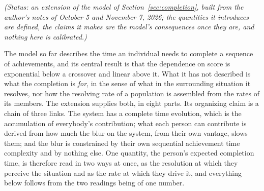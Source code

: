 \documentclass{article}
\begin{document}
\noindent\emph{(Status: an extension of the model of Section~\ref{sec:completion}, built from the author's notes of October 5 and November 7, 2026; the quantities it introduces are defined, the claims it makes are the model's consequences once they are, and nothing here is calibrated.)}

The model so far describes the time an individual needs to complete a sequence of achievements, and its central result is that the dependence on score is exponential below a crossover and linear above it. What it has not described is what the completion is \emph{for}, in the sense of what in the surrounding situation it resolves, nor how the resolving rate of a population is assembled from the rates of its members. The extension supplies both, in eight parts. Its organizing claim is a chain of three links. The system has a complete time evolution, which is the accumulation of everybody's contribution; what each person can contribute is derived from how much the blur on the system, from their own vantage, slows them; and the blur is constrained by their own sequential achievement time complexity and by nothing else. One quantity, the person's expected completion time, is therefore read in two ways at once, as the resolution at which they perceive the situation and as the rate at which they drive it, and everything below follows from the two readings being of one number.
\end{document}
